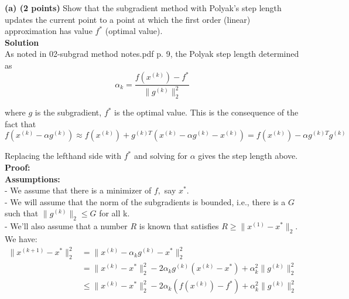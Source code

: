 \documentclass{article}
\begin{document}
\textbf{(a) (2 points)} Show that the subgradient method with Polyak's step length updates the current point to a point at which the first order (linear) approximation has
value $f^*$ (optimal value).\\

\textbf{Solution}\\

As noted in 02-subgrad \textunderscore method \textunderscore notes.pdf p. 9, the Polyak step length determined as
\begin{equation}\label{eq:Polyak1}
\alpha_k = \frac{f(x^{(k)}) - f^*}{\lVert g^{(k)}\rVert_2^2}
\end{equation}

where $g$ is the subgradient, $f^*$ is the optimal value.
This is the consequence of the fact that
$$
f(x^{(k)} - \alpha g^{(k)}) \approx 
f(x^{(k)}) + 
g^{(k) T} (x^{(k)} - \alpha g^{(k)} - x^{(k)}) = 
f(x^{(k)}) - \alpha g^{(k) T} g^{(k)}
$$

Replacing the lefthand side
with $f^*$ and solving for $\alpha$ gives the step length above. \\

\textbf{Proof:} \\

\textbf{Assumptions:} \\

 - We assume that there is a minimizer of $f,$ say $x^*.$ \\
 
- We will assume that the norm of the subgradients is bounded, i.e., there is a $G$ such that
$ \lVert g^{(k)}\rVert _2 \leq G$ for all k. \\

- We’ll also assume that a number $R$ is known that satisfies
$R \geq \lVert x^{(1)} - x^* \rVert_2.$ \\

We have:\\
\begin{align*}
	\lVert x^{(k+1)} - x^* \rVert_2^2 & = 
	\lVert x^{(k)} - \alpha_k g^{(k)} - x^* \rVert_2^2 \\ &=  
	\lVert x^{(k)}  - x^* \rVert_2^2 - 
	2 \alpha_k g^{(k)} (x^{(k)}  - x^*) + 
	\alpha_k^2 \lVert g^{(k)} \rVert_2^2
	\\ & \leq \lVert x^{(k)}  - x^* \rVert_2^2 - 
	2 \alpha_k (f(x^{(k)})  - f^*) + 
	\alpha_k^2 \lVert g^{(k)} \rVert_2^2\\
\end{align*}
\end{document}
